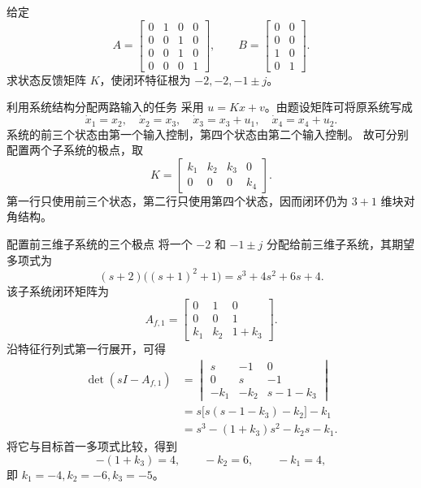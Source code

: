 \documentclass[11pt]{article}
\begin{document}
\begin{problem}[原题 10]
给定
\[
A=\begin{bmatrix}0&1&0&0\\0&0&1&0\\0&0&1&0\\0&0&0&1\end{bmatrix},\qquad
B=\begin{bmatrix}0&0\\0&0\\1&0\\0&1\end{bmatrix}.
\]
求状态反馈矩阵 $K$，使闭环特征根为 $-2,-2,-1\pm j$。
\end{problem}
\begin{solution}
\begin{proofstep}{利用系统结构分配两路输入的任务}
采用 $u=Kx+v$。由题设矩阵可将原系统写成
\[
\dot x_1=x_2,\quad \dot x_2=x_3,\quad
\dot x_3=x_3+u_1,\quad \dot x_4=x_4+u_2.
\]
系统的前三个状态由第一个输入控制，第四个状态由第二个输入控制。
故可分别配置两个子系统的极点，取
\[
K=\begin{bmatrix}k_1&k_2&k_3&0\\0&0&0&k_4\end{bmatrix}.
\]
第一行只使用前三个状态，第二行只使用第四个状态，因而闭环仍为 $3+1$ 维块对角结构。
\end{proofstep}

\begin{proofstep}{配置前三维子系统的三个极点}
将一个 $-2$ 和 $-1\pm j$ 分配给前三维子系统，其期望多项式为
\[
(s+2)\bigl((s+1)^2+1\bigr)=s^3+4s^2+6s+4.
\]
该子系统闭环矩阵为
\[
A_{f,1}=\begin{bmatrix}0&1&0\\0&0&1\\k_1&k_2&1+k_3\end{bmatrix}.
\]
沿特征行列式第一行展开，可得
\begin{align*}
\det(sI-A_{f,1})
&=\begin{vmatrix}s&-1&0\\0&s&-1\\-k_1&-k_2&s-1-k_3\end{vmatrix}\\
&=s\bigl[s(s-1-k_3)-k_2\bigr]-k_1\\
&=s^3-(1+k_3)s^2-k_2s-k_1.
\end{align*}
将它与目标首一多项式比较，得到
\[
-(1+k_3)=4,\qquad -k_2=6,\qquad -k_1=4,
\]
即 $k_1=-4,k_2=-6,k_3=-5$。
\end{proofstep}


\end{solution}
\end{document}
